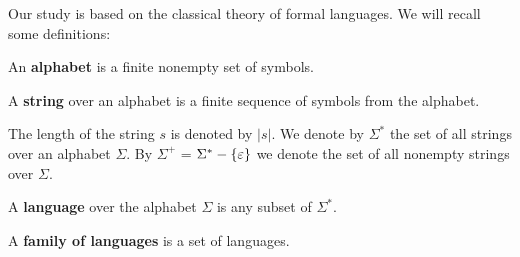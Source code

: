 Our study is based on the classical theory of formal languages. We will recall some definitions:

\begin{definition}
An  {\bf alphabet} is a finite nonempty set of symbols.
\end{definition}

\begin{definition}
A  {\bf string} over an alphabet is a finite sequence of symbols from the alphabet.
\end{definition}

The length of the string $s$ is denoted by $|s|$. We denote by $\Sigma^*$ the set of all strings over an alphabet $\Sigma$. By $\Sigma^+$ = $\Sigma^* - \{\varepsilon\}$ we denote the set of all nonempty strings over $\Sigma$.

\begin{definition}
A  {\bf language} over the alphabet $\Sigma$ is any subset of $\Sigma^*$.
\end{definition}

\begin{definition}
A  {\bf family of languages} is a set of languages.
\end{definition}
